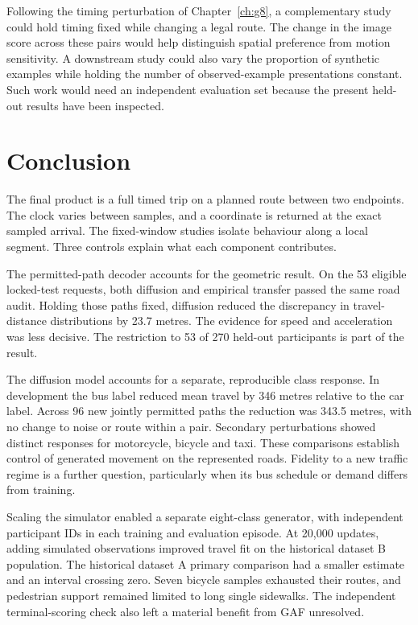 Following the timing perturbation of Chapter~\ref{ch:g8}, a complementary study could hold timing fixed while changing a legal route. The change in the image score across these pairs would help distinguish spatial preference from motion sensitivity. A downstream study could also vary the proportion of synthetic examples while holding the number of observed-example presentations constant. Such work would need an independent evaluation set because the present held-out results have been inspected.

\section{Conclusion}
The final product is a full timed trip on a planned route between two endpoints. The clock varies between samples, and a coordinate is returned at the exact sampled arrival. The fixed-window studies isolate behaviour along a local segment. Three controls explain what each component contributes.

The permitted-path decoder accounts for the geometric result. On the 53 eligible locked-test requests, both diffusion and empirical transfer passed the same road audit. Holding those paths fixed, diffusion reduced the discrepancy in travel-distance distributions by 23.7 metres. The evidence for speed and acceleration was less decisive. The restriction to 53 of 270 held-out participants is part of the result.

The diffusion model accounts for a separate, reproducible class response. In development the bus label reduced mean travel by 346 metres relative to the car label. Across 96 new jointly permitted paths the reduction was 343.5 metres, with no change to noise or route within a pair. Secondary perturbations showed distinct responses for motorcycle, bicycle and taxi. These comparisons establish control of generated movement on the represented roads. Fidelity to a new traffic regime is a further question, particularly when its bus schedule or demand differs from training.

Scaling the simulator enabled a separate eight-class generator, with independent participant IDs in each training and evaluation episode. At 20,000 updates, adding simulated observations improved travel fit on the historical dataset B population. The historical dataset A primary comparison had a smaller estimate and an interval crossing zero. Seven bicycle samples exhausted their routes, and pedestrian support remained limited to long single sidewalks. The independent terminal-scoring check also left a material benefit from GAF unresolved.


